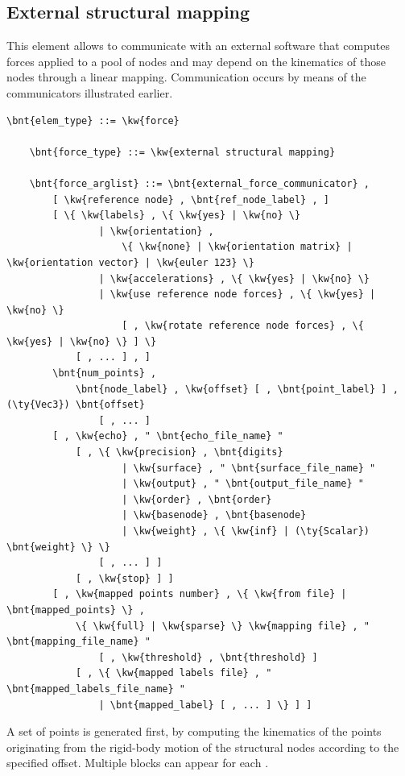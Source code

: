 \subsection{External structural mapping}
\label{sec:EL:FORCE:EXTERNAL:STRUCTURAL_MAPPING}
This element allows to communicate with an external software that computes
forces applied to a pool of nodes and may depend on the kinematics of those
nodes through a linear mapping.
Communication occurs by means of the communicators illustrated earlier.
\begin{Verbatim}[commandchars=\\\{\}]
    \bnt{elem_type} ::= \kw{force}

    \bnt{force_type} ::= \kw{external structural mapping}

    \bnt{force_arglist} ::= \bnt{external_force_communicator} ,
        [ \kw{reference node} , \bnt{ref_node_label} , ]
        [ \{ \kw{labels} , \{ \kw{yes} | \kw{no} \}
                | \kw{orientation} ,
                    \{ \kw{none} | \kw{orientation matrix} | \kw{orientation vector} | \kw{euler 123} \}
                | \kw{accelerations} , \{ \kw{yes} | \kw{no} \}
                | \kw{use reference node forces} , \{ \kw{yes} | \kw{no} \}
                    [ , \kw{rotate reference node forces} , \{ \kw{yes} | \kw{no} \} ] \}
            [ , ... ] , ]
        \bnt{num_points} ,
            \bnt{node_label} , \kw{offset} [ , \bnt{point_label} ] , (\ty{Vec3}) \bnt{offset}
                [ , ... ]
        [ , \kw{echo} , " \bnt{echo_file_name} "
            [ , \{ \kw{precision} , \bnt{digits}
                    | \kw{surface} , " \bnt{surface_file_name} "
                    | \kw{output} , " \bnt{output_file_name} "
                    | \kw{order} , \bnt{order}
                    | \kw{basenode} , \bnt{basenode}
                    | \kw{weight} , \{ \kw{inf} | (\ty{Scalar}) \bnt{weight} \} \}
                [ , ... ] ]
            [ , \kw{stop} ] ]
        [ , \kw{mapped points number} , \{ \kw{from file} | \bnt{mapped_points} \} ,
            \{ \kw{full} | \kw{sparse} \} \kw{mapping file} , " \bnt{mapping_file_name} "
                [ , \kw{threshold} , \bnt{threshold} ]
            [ , \{ \kw{mapped labels file} , " \bnt{mapped_labels_file_name} "
                | \bnt{mapped_label} [ , ... ] \} ] ]
\end{Verbatim}
A set of  points is generated first,
by computing the kinematics of the points originating
from the rigid-body motion of the structural nodes 
according to the specified offset.
Multiple  blocks can appear for each .

